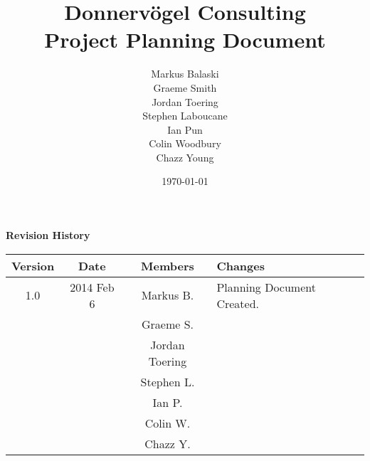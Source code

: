 \documentclass{article}
\begin{document}
\title{Donnervögel Consulting \\ Project Planning Document}
\author{Markus Balaski \\ Graeme Smith \\ Jordan Toering \\ Stephen Laboucane \\ Ian Pun \\ Colin Woodbury \\ Chazz Young}
\date{\today}
\maketitle
\clearpage

\textbf{Revision History}
\begin{center}
  \begin{tabular}{| c | c | c | l |}
    \hline
    Version & Date & Members & Changes\\
    \hline
    1.0 & 2014 Feb 6 & Markus B. & Planning Document Created.\\
    & & Graeme S. & \\
    & & Jordan Toering & \\
    & & Stephen L. & \\
    & & Ian P. & \\
    & & Colin W. & \\
    & & Chazz Y. & \\
    \hline
  \end{tabular}
\end{center}
\clearpage

\tableofcontents
\clearpage

\end{document}
